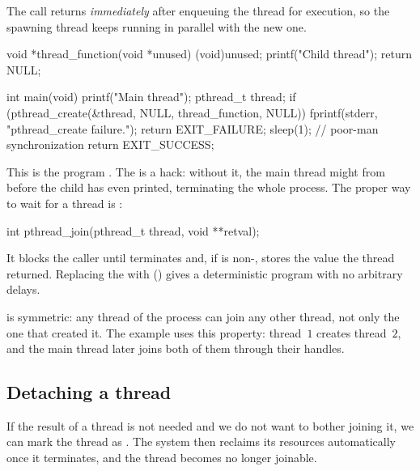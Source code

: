 The call returns \emph{immediately} after enqueuing the thread for execution, so the spawning thread keeps running in parallel with the new one.

\begin{codeblock}[language=C]
void *thread_function(void *unused) {
    (void)unused;
    printf("Child thread\n");
    return NULL;
}

int main(void) {
    printf("Main thread\n");
    pthread_t thread;
    if (pthread_create(&thread, NULL, thread_function, NULL)) {
        fprintf(stderr, "pthread_create failure.\n");
        return EXIT_FAILURE;
    }
    sleep(1);          // poor-man synchronization
    return EXIT_SUCCESS;
}
\end{codeblock}

This is the program . The  is a hack: without it, the main thread might  from  before the child has even printed, terminating the whole process. The proper way to wait for a thread is :

\begin{codeblock}[language=C]
int pthread_join(pthread_t thread, void **retval);
\end{codeblock}

It blocks the caller until  terminates and, if  is non-, stores the value the thread returned. Replacing the  with  () gives a deterministic program with no arbitrary delays.

\begin{observationblock}
 is symmetric: any thread of the process can join any other thread, not only the one that created it. The example  uses this property: thread~$1$ creates thread~$2$, and the main thread later joins both of them through their handles.
\end{observationblock}

\subsection{Detaching a thread}

If the result of a thread is not needed and we do not want to bother joining it, we can mark the thread as . The system then reclaims its resources automatically once it terminates, and the thread becomes no longer joinable.

